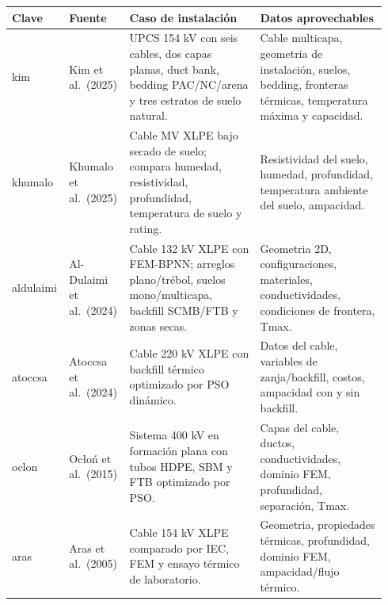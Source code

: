 \documentclass[11pt,a4paper,oneside]{report}
\newcounter{none}
\begin{document}
{\def\LTcaptype{none} %
\begin{longtable}[]{@{}
  >{\RaggedRight\arraybackslash}p{0.13\linewidth}
  >{\RaggedRight\arraybackslash}p{0.14\linewidth}
  >{\RaggedRight\arraybackslash}p{0.34\linewidth}
  >{\RaggedRight\arraybackslash}p{0.33\linewidth}@{}}
\toprule\noalign{}
\begin{minipage}[b]{\linewidth}\raggedright
Clave
\end{minipage} & \begin{minipage}[b]{\linewidth}\raggedright
Fuente
\end{minipage} & \begin{minipage}[b]{\linewidth}\raggedright
Caso de instalación
\end{minipage} & \begin{minipage}[b]{\linewidth}\raggedright
Datos aprovechables
\end{minipage} \\
\midrule\noalign{}
\endhead
\bottomrule\noalign{}
\endlastfoot
kim\-2025 & Kim et al.~(2025) & UPCS 154 kV con seis cables, dos capas
planas, duct bank, bedding PAC/NC/arena y tres estratos de suelo
natural. & Cable multicapa, geometria de instalación, suelos, bedding,
fronteras térmicas, temperatura máxima y capacidad. \\
khumalo\-2025 & Khumalo et al.~(2025) & Cable MV XLPE bajo secado de
suelo; compara humedad, resistividad, profundidad, temperatura de suelo
y rating. & Resistividad del suelo, humedad, profundidad, temperatura
ambiente del suelo, ampacidad. \\
aldulaimi\-2024 & Al-Dulaimi et al.~(2024) & Cable 132 kV XLPE con
FEM-BPNN; arreglos plano/trébol, suelos mono/multicapa, backfill
SCMB/FTB y zonas secas. & Geometria 2D, configuraciones, materiales,
conductividades, condiciones de frontera, Tmax. \\
atoccsa\-2024 & Atoccsa et al.~(2024) & Cable 220 kV XLPE con backfill
térmico optimizado por PSO dinámico. & Datos del cable, variables de
zanja/backfill, costos, ampacidad con y sin backfill. \\
oclon\-2015 & Ocłoń et al.~(2015) & Sistema 400 kV en formación plana con
tubos HDPE, SBM y FTB optimizado por PSO. & Capas del cable, ductos,
conductividades, dominio FEM, profundidad, separación, Tmax. \\
aras\-2005 & Aras et al.~(2005) & Cable 154 kV XLPE comparado por IEC, FEM
y ensayo térmico de laboratorio. & Geometria, propiedades térmicas,
profundidad, dominio FEM, ampacidad/flujo térmico. \\

\end{longtable}}
\end{document}
